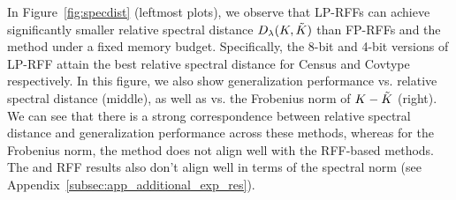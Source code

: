 In Figure~\ref{fig:specdist} (leftmost plots), we observe that LP-RFFs can achieve significantly smaller relative spectral distance $D_{\lambda}(K,\tilde{K})$ than FP-RFFs and the \Nystrom method under a fixed memory budget. Specifically, the 8-bit and 4-bit versions of LP-RFF attain the best relative spectral distance for Census and Covtype respectively. In this figure, we also show generalization performance vs. relative spectral distance (middle), as well as vs. the Frobenius norm of $K-\tilde{K}$ (right).  We can see that there is a strong correspondence between relative spectral distance and generalization performance across these methods, whereas for the Frobenius norm, the \Nystrom method does not align well with the RFF-based methods. The \Nystrom and RFF results also don't align well in terms of the spectral norm (see Appendix~\ref{subsec:app_additional_exp_res}).


